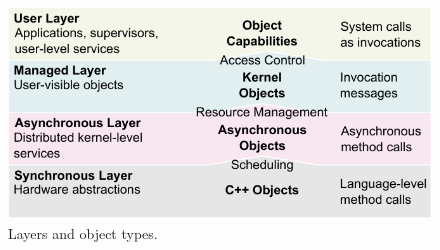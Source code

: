 \begin{figure}
  \centering
  \includegraphics[scale=1]{fig/layers.pdf}
  \caption{Layers and object types.}
  \label{fig:layers}
\end{figure}

